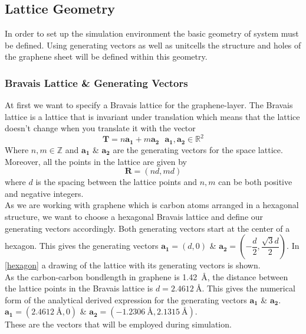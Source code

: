\subsection{Lattice Geometry}
In order to set up the simulation environment the basic geometry of system must be defined. Using generating vectors as well as unitcells the structure and holes of the graphene sheet will be defined within this geometry.
\subsubsection{Bravais Lattice \& Generating Vectors}
At first we want to specify a Bravais lattice for the graphene-layer. The Bravais lattice is a lattice that is invariant under translation which means that the lattice doesn't change when you translate it with the vector
\begin{equation}
 \mathbf{T}=n\mathbf{a_{1}}+m\mathbf{a_{2}}\ \ \ \mathbf{a_{1}},\mathbf{a_{2}} \in \mathbb{R}^{2}
\end{equation}
Where $n,m \in \mathbb{Z}$ and $\mathbf{a_{1}}$ \& $\mathbf{a_{2}}$ are the generating vectors for the space lattice. Moreover, all the points in the lattice are given by
\begin{equation}
 \mathbf{R}=(nd,md)
\end{equation}
where $d$ is the spacing between the lattice points and $n,m$ can be both positive and negative integers. \\
As we are working with graphene which is carbon atoms arranged in a hexagonal structure, we want to choose a hexagonal Bravais lattice and define our generating vectors accordingly. Both generating vectors start at the center of a hexagon. This gives the generating vectors $\mathbf{a_{1}}=(d,0)$ \& $\mathbf{a_{2}}=\left(-\dfrac{d}{2},\dfrac{\sqrt{3}d}{2}\right)$. In \cref{hexagon} a drawing of the lattice with its generating vectors is shown.\\
As the carbon-carbon bondlength in graphene is \SI{1.42}{\angstrom}, the distance between the lattice points  in the Bravais lattice is $d=\SI{2.4612}{\angstrom}$. This gives the numerical form of the analytical derived expression for the generating vectors  $\mathbf{a_{1}}$ \& $\mathbf{a_{2}}$. \\
$\mathbf{a_{1}}=(\SI{2.4612}{\angstrom},0)$ \& $\mathbf{a_{2}}=\left(-\SI{1.2306}{\angstrom},\SI{2.1315}{\angstrom}\right)$. \\These are the vectors that will be employed during simulation. 
